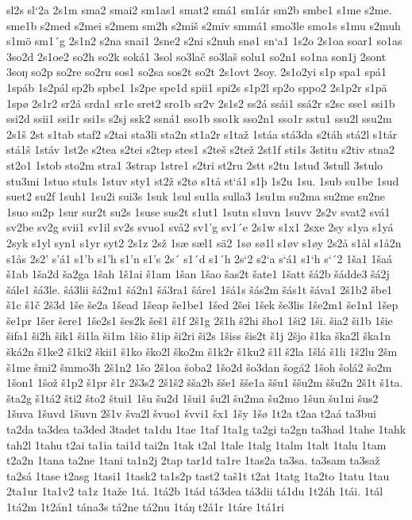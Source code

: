 sl2s
sl`2a
2s1m
sma2
smai2
sm1as1
smat2
smá1
sm1ár
sm2b
smbe1
s1me
s2me.
sme1b
s2med
s2mei
s2mem
sm2h
s2miš
s2miv
smmá1
smo3le
smo1s
s1mu
s2muh
s1mö
sm1´g
2s1n2
s2na
snai1
2sne2
s2ni
s2nuh
snø1
sn`a1
1s2o
2s1oa
soar1
so1as
3so2d
2s1oe2
so2h
so2k
soká1
3sol
so3lač
so3laš
solu1
so2n1
so1na
son1j
2sont
3soŋ
so2p
so2re
so2ru
sos1
so2sa
sos2t
so2t
2s1ovt
2soy.
2s1o2yi
s1p
spa1
spá1
1spáb
1s2pál
sp2b
spbe1
1s2pe
spe1d
spii1
spi2s
s1p2l
sp2o
sppo2
2s1p2r
s1pä
1spø
2s1r2
sr2á
srda1
sr1e
sret2
sro1b
sr2v
2s1s2
ss2á
ssái1
ssá2r
s2sc
sse1
ssi1b
ssi2d
ssii1
ssi1r
ssi1s
s2sj
ssk2
ssná1
sso1b
sso1k
sso2n1
sso1r
sstu1
ssu2l
ssu2m
2s1š
2st
s1tab
staf2
s2tai
sta3li
sta2n
st1a2r
s1taž
1stáa
stá3da
s2táh
stá2l
s1tár
stá1š
1stáv
1st2e
s2tea
s2tei
s2tep
stes1
s2teš
s2tež
2st1f
sti1s
3stitu
s2tiv
stna2
st2o1
1stob
sto2m
stra1
3strap
1stre1
s2tri
st2ru
2stt
s2tu
1stuđ
3stull
3stulo
stu3mi
1stuo
stu1s
1stuv
sty1
st2ž
s2tø
s1tå
st`á1
s1þ
1s2u
1su.
1sub
su1be
1sud
suet2
su2f
1suh1
1su2i
sui3s
1suk
1sul
su1la
sulla3
1su1m
su2ma
su2me
su2ne
1suo
su2p
1sur
sur2t
su2s
1suse
sus2t
s1ut1
1sutn
s1uvn
1suvv
2s2v
svat2
svá1
sv2be
sv2g
svii1
sv1il
sv2s
svuo1
svå2
sv1'g
sv1´e
2s1w
s1x1
2sxe
2sy
s1ya
s1yá
2syk
s1yl
syn1
s1yr
syt2
2s1z
2sž
1sæ
sæl1
sä2
1sø
sø1l
s1øv
s1øy
2s2å
s1ål
s1å2n
s1ås
2s2'
s'á1
s1'b
s1'h
s1'n
s1's
2s´
s1´d
s1´h
2s`2
s2`a
s`á1
s1`h
s`´2
1ša1
1šaá
š1ab
1ša2d
ša2ga
1šah
1š1ai
š1am
1šan
1šao
šas2t
šate1
1šatt
šá2b
šádde3
šá2j
šále1
šá3le.
šá3lii
šá2m1
šá2n1
šá3ra1
šáre1
1šá1s
šás2m
šás1t
šáva1
2š1b2
šbe1
š1c
š1č
2š3d
1še
še2a
1šead
1šeap
še1be1
1šed
2šei
1šek
še3lis
1še2m1
še1n1
1šep
še1pr
1šer
šere1
1še2s1
šes2k
šeš1
š1f
2š1g
2š1h
š2hi
šho1
1ši2
1ši.
šia2
ši1b
1šie
šifa1
ši2h
šik1
ši1la
ši1m
1šio
š1ip
ši2ri
ši2s
1šiss
šis2t
š1j
2šjo
š1ka
ška2l
ška1n
šká2n
š1ke2
š1ki2
škii1
š1ko
ško2l
ško2m
š1k2r
š1ku2
š1l
š2la
1šlá
š1li
1š2lu
2šm
š1me
šmi2
šmmo3h
2š1n2
1šo
2š1oa
šoba2
1šo2d
šo3dan
šogá2
1šoh
šolá2
šo2m
1šon1
1šož
š1p2
š1pr
š1r
2š3s2
2š1š2
šša2b
šše1
šše1a
ššu1
ššu2m
ššu2n
2š1t
š1ta.
šta2g
š1tá2
šti2
što2
štui1
1šu
šu2d
1šui1
šu2l
šu2ma
šu2mo
1šun
šu1ni
šus2
1šuva
1šuvd
1šuvn
2š1v
šva2l
švuo1
švvi1
šx1
1šy
1šø
1t2a
t2aa
t2aá
ta3bui
ta2da
ta3dea
ta3ded
3tadet
ta1du
1tae
1taf
1ta1g
ta2gi
ta2gn
ta3had
1tahe
1tahk
tah2l
1tahu
t2ai
ta1ia
tai1d
tai2n
1tak
t2al
1tale
1talg
1talm
1talt
1talu
1tam
t2a2n
1tana
ta2ne
1tani
ta1n2j
2tap
tar1d
ta1re
1tas2a
ta3sa.
ta3sam
ta3saž
ta2sá
1tase
t2asg
1tasi1
1task2
ta1s2p
tast2
taš1t
t2at
1tatg
1ta2to
1tatu
1tau
2ta1ur
1ta1v2
ta1z
1taže
1tá.
1tá2b
1tád
tá3dea
tá3dii
tá1du
1t2áh
1tái.
1tál
1tá2m
1t2án1
tána3s
tá2ne
tá2nu
1táŋ
t2á1r
1táre
1tá1ri
